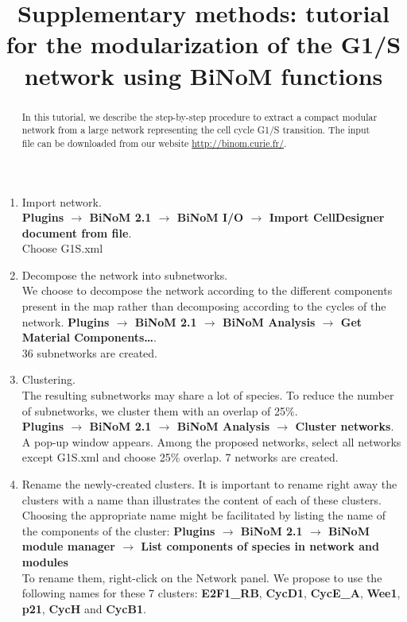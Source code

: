 \documentclass[a4paper,10pt]{article}
\title{Supplementary methods: tutorial for the modularization of the G1/S network using BiNoM functions}
\author{}
\begin{document}
\maketitle

\begin{abstract}
In this tutorial, we describe the step-by-step procedure to extract a compact modular network from a large network representing the cell cycle G1/S transition. The input file can be downloaded from our website \url{http://binom.curie.fr/}.
\end{abstract}


\begin{enumerate}
\item Import network. \\
\textbf{Plugins $\rightarrow$ BiNoM 2.1 $\rightarrow$ BiNoM I/O $\rightarrow$ Import CellDesigner document
from file}.  \\
Choose G1S.xml


\item	Decompose the network into subnetworks. \\
We choose to decompose the network according to the different components present
in the map rather than decomposing according to the cycles of the network. 
\textbf{Plugins $\rightarrow$ BiNoM 2.1 $\rightarrow$ BiNoM Analysis $\rightarrow$ Get Material
Components…}.\\
36 subnetworks are created.

\item	Clustering. \\
The resulting subnetworks may share a lot of species. To reduce the number of
subnetworks, we cluster them with an overlap of 25\%. \\
\textbf{Plugins $\rightarrow$  BiNoM 2.1 $\rightarrow$ BiNoM Analysis $\rightarrow$ Cluster networks}. \\
A pop-up window appears. Among the proposed networks, select all networks except
G1S.xml and choose 25\% overlap. 7 networks are created.

\item	Rename the newly-created clusters.
It is important to rename right away the clusters with a name than illustrates
the content of each of these clusters. 
Choosing the appropriate name might be facilitated by listing the name of the
components of the cluster: \textbf{Plugins $\rightarrow$  BiNoM 2.1 $\rightarrow$ BiNoM module manager
$\rightarrow$ List components of species in network and modules} \\
To rename them, right-click on the Network panel.
We propose to use the following names for these 7 clusters: \textbf{E2F1\_RB},
\textbf{CycD1}, \textbf{CycE\_A}, \textbf{Wee1}, \textbf{p21}, \textbf{CycH} and
\textbf{CycB1}.



\end{enumerate}
\end{document}
